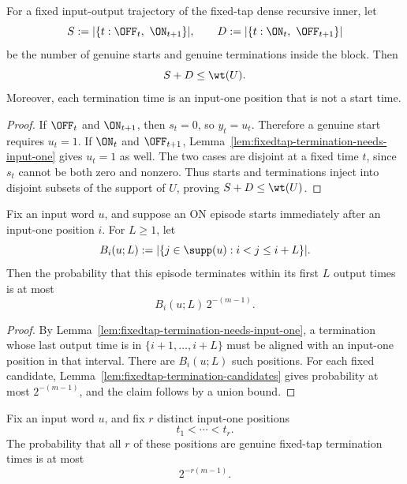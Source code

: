 \begin{lemma}
\label{lem:fixedtap-episode-budget}
For a fixed input-output trajectory of the fixed-tap dense recursive inner, let
\[
S:=|\{t:\OFF_t,\ \ON_{t+1}\}|,
\qquad
D:=|\{t:\ON_t,\ \OFF_{t+1}\}|
\]
be the number of genuine starts and genuine terminations inside the block. Then
\[
S+D \le \wt(U).
\]
Moreover, each termination time is an input-one position that is not a start time.
\end{lemma}

\begin{proof}
If \(\OFF_t\) and \(\ON_{t+1}\), then \(s_t=0\), so \(y_t=u_t\). Therefore a genuine start requires \(u_t=1\).
If \(\ON_t\) and \(\OFF_{t+1}\), Lemma~\ref{lem:fixedtap-termination-needs-input-one} gives \(u_t=1\) as well.
The two cases are disjoint at a fixed time \(t\), since \(s_t\) cannot be both zero and nonzero. Thus starts and
terminations inject into disjoint subsets of the support of \(U\), proving \(S+D\le \wt(U)\).
\end{proof}

\begin{lemma}
\label{lem:fixedtap-one-episode-termination}
Fix an input word \(u\), and suppose an ON episode starts immediately after an input-one position \(i\). For
\(L\ge 1\), let
\[
B_i(u;L):=
|\{j\in \supp(u): i<j\le i+L\}|.
\]
Then the probability that this episode terminates within its first \(L\) output times is at most
\[
B_i(u;L)\,2^{-(m-1)}.
\]
\end{lemma}

\begin{proof}
By Lemma~\ref{lem:fixedtap-termination-needs-input-one}, a termination whose last output time is in
\(\{i+1,\dots,i+L\}\) must be aligned with an input-one position in that interval. There are \(B_i(u;L)\) such
positions. For each fixed candidate, Lemma~\ref{lem:fixedtap-termination-candidates} gives probability at most
\(2^{-(m-1)}\), and the claim follows by a union bound.
\end{proof}

\begin{lemma}
\label{lem:fixedtap-multicandidate-termination}
Fix an input word \(u\), and fix \(r\) distinct input-one positions
\[
t_1<\cdots<t_r.
\]
The probability that all \(r\) of these positions are genuine fixed-tap termination times is at most
\[
2^{-r(m-1)}.
\]
\end{lemma}

